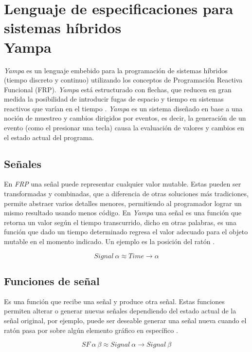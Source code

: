 \section{Lenguaje de especificaciones para sistemas híbridos\\ Yampa}

\emph{Yampa} es un lenguaje embebido para la programación de sistemas híbridos (tiempo discreto y continuo) utilizando los conceptos de Programación Reactiva Funcional (FRP). \emph{Yampa} está estructurado con flechas, que reducen en gran medida la posibilidad de introducir fugas de espacio y tiempo en sistemas reactivos que varían en el tiempo \cite{wiki:Yampa}. \emph{Yampa} es un sistema diseñado en base a una noción de muestreo y cambios dirigidos por eventos, es decir, la generación de un evento (como el presionar una tecla) causa la evaluación de valores y cambios en el estado actual del programa.

\subsection{Señales}
En \emph{FRP} una señal puede representar cualquier valor mutable. Estas pueden ser transformadas y combinadas, que a diferencia de otras soluciones más tradiciones, permite abstraer varios detalles menores, permitiendo al programador lograr un mismo resultado usando menos código. En \emph{Yampa} una señal es una función que retorna un valor según el tiempo transcurrido, dicho en otras palabras, es una función que dado un tiempo determinado regresa el valor adecuado para el objeto mutable en el momento indicado. Un ejemplo es la posición del ratón \cite{wiki:Yampa} \cite{Courtney2003b}.

\begin{equation}
Signal \ \alpha \approx Time \rightarrow \alpha
\end{equation}

\subsection{Funciones de señal}
Es una función que recibe una señal y produce otra señal. Estas funciones permiten alterar o generar nuevas señales dependiendo del estado actual de la señal original, por ejemplo, puede ser deseable generar una señal nueva cuando el ratón pasa por sobre algún elemento gráfico en específico \cite{wiki:Yampa}.

\begin{equation}
SF \ \alpha \ \beta \approx Signal \ \alpha \rightarrow Signal \ \beta
\end{equation}

